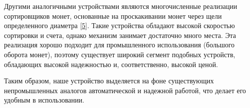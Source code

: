 Другими аналогичными устройствами являются многочисленные реализации сортировщиков монет, основанные на проскакивании монет через щели определенного диаметра [\href{https://www.youtube.com/watch?v=u0fAAhLuL24&ab_channel=KryzerChannel}{5}]. Такие устройства обладают высокой скоростью сортировки и счета, однако механизм занимает достаточно много места. Эта реализация хорошо подходит для промышленного использования (большого оборота монет), поэтому существует широкий сегмент подобных устройств, обладающих высокой надежностью и, соответственно, высокой ценой. 
\par\medskip

Таким образом, наше устройство выделяется на фоне существующих непромышленных аналогов автоматической и надежной работой, что делает его удобным в использовании.


